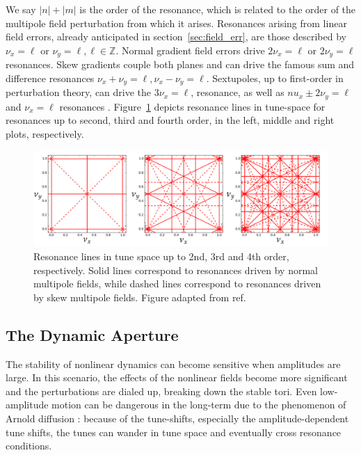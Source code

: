     We say $|n|+|m|$ is the order of the resonance, which is related to the order of the multipole field perturbation from which it arises.
    Resonances arising from linear field errors, already anticipated in section~\ref{sec:field_err}, are those described by $\nu_x=\ell$ or $\nu_y =\ell, \ell\in\mathbb{Z}$. Normal gradient field errors drive $2\nu_x=\ell$ or $2\nu_y =\ell$ resonances. Skew gradients couple both planes and can drive the famous sum and difference resonances $\nu_x + \nu_y = \ell, \nu_x - \nu_y = \ell$. Sextupoles, up to first-order in perturbation theory, can drive the $3\nu_x=\ell$, resonance, as well as $nu_x \pm 2\nu_y = \ell$ and $\nu_x =\ell$ resonances \cite[section 11.2.4]{wolski_beam_2014}. Figure~\ref{fig:resons} depicts resonance lines in tune-space for resonances up to second, third and fourth order, in the left, middle and right plots, respectively.
\begin{figure}[thb]
    \centering
    \includegraphics[width=\textwidth]{Images/tunes.png}
    \caption[Resonance lines in tune space up to 2nd, 3rd and 4th order.]{Resonance lines in tune space up to 2nd, 3rd and 4th order, respectively. Solid lines correspond to resonances driven by normal multipole fields, while dashed lines correspond to resonances driven by skew multipole fields. Figure adapted from ref.~\cite{bartosik_first2022}}
    \label{fig:resons}
\end{figure}
\subsection{The Dynamic Aperture}
    The stability of nonlinear dynamics can become sensitive when amplitudes are large. In this scenario, the effects of the nonlinear fields become more significant and the perturbations are dialed up, breaking down the stable tori. Even low-amplitude motion can be dangerous in the long-term due to the phenomenon of Arnold diffusion \cite{wolski_beam_2014, arnold_instability1964}: because of the tune-shifts, especially the amplitude-dependent tune shifts, the tunes can wander in tune space and eventually cross resonance conditions.

